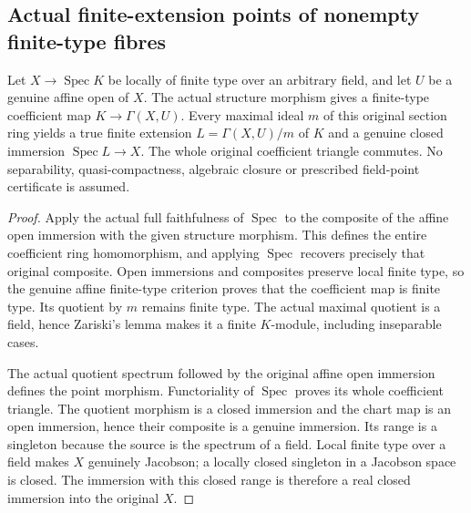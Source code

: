 \subsection{Actual finite-extension points of nonempty finite-type fibres}
\label{subsec:finite-type-field-points}

\begin{lemma}
\label{scheme:actual-affine-finite-field-point}
\leanok
Let $X\to\operatorname{Spec}K$ be locally of finite type over an
arbitrary field, and let $U$ be a genuine affine open of $X$.
The actual structure morphism gives a finite-type coefficient map
$K\to\Gamma(X,U)$. Every maximal ideal $m$ of this original
section ring yields a true finite extension $L=\Gamma(X,U)/m$
of $K$ and a genuine closed immersion $\operatorname{Spec}L\to X$.
The whole original coefficient triangle commutes. No separability,
quasi-compactness, algebraic closure or prescribed field-point
certificate is assumed.
\end{lemma}
\begin{proof}
Apply the actual full faithfulness of $\operatorname{Spec}$ to the
composite of the affine open immersion with the given structure
morphism. This defines the entire coefficient ring homomorphism,
and applying $\operatorname{Spec}$ recovers precisely that original
composite. Open immersions and composites preserve local finite
type, so the genuine affine finite-type criterion proves that the
coefficient map is finite type. Its quotient by $m$ remains finite
type. The actual maximal quotient is a field, hence Zariski's
lemma makes it a finite $K$-module, including inseparable cases.

The actual quotient spectrum followed by the original affine open
immersion defines the point morphism. Functoriality of
$\operatorname{Spec}$ proves its whole coefficient triangle.
The quotient morphism is a closed immersion and the chart map is
an open immersion, hence their composite is a genuine immersion.
Its range is a singleton because the source is the spectrum of a
field. Local finite type over a field makes $X$ genuinely
Jacobson; a locally closed singleton in a Jacobson space is
closed. The immersion with this closed range is therefore a real
closed immersion into the original $X$.
\end{proof}

